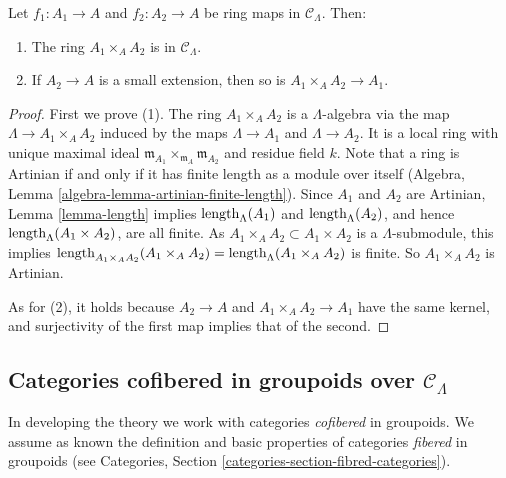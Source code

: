 \begin{lemma}
\label{lemma-fiber-product-CLambda}
Let $f_1 : A_1 \rightarrow A$ and $f_2 : A_2 \rightarrow A$ be ring maps in 
$\mathcal C_{\Lambda}$. Then:
\begin{enumerate}
\item The ring $A_1 \times_{A} A_2$ is in $\mathcal C_{\Lambda}$.
\item If $A_2 \rightarrow A$ is a small extension, then so is $A_1 \times_{A} 
A_2 \rightarrow A_1$.
\end{enumerate}
\end{lemma}

\begin{proof}
First we prove (1).  The ring $A_1 \times_{A} A_2$ is a $\Lambda$-algebra via 
the map $\Lambda \rightarrow A_1 \times_{A} A_2$ induced by the maps $\Lambda 
\rightarrow A_1$ and $\Lambda \rightarrow A_2$.  It is a local ring with unique 
maximal ideal $\mathfrak{m}_{A_1} \times_{\mathfrak{m}_{A}} \mathfrak{m}_{A_2}$ 
and residue field $k$. Note that a ring is Artinian if and only if it has 
finite length as a module over itself
(Algebra, Lemma \ref{algebra-lemma-artinian-finite-length}).
Since $A_1$ and $A_2$ are Artinian, Lemma \ref{lemma-length} implies 
$\textnormal{length}_{\Lambda}(A_1)$ and $\textnormal{length}_{\Lambda}(A_2)$, 
and hence $\textnormal{length}_{\Lambda}(A_1 \times A_2)$, are all finite.  As 
$A_1 \times_A A_2 \subset A_1 \times A_2$ is a $\Lambda$-submodule, this 
implies $\textnormal{length}_{A_1 \times_A A_2}(A_1 \times_{A} A_2) = 
\textnormal{length}_{\Lambda}(A_1 \times_{A} A_2)$ is finite. So $A_1 
\times_{A} A_2$ is Artinian.

\medskip \noindent
As for (2), it holds because $A_2 \rightarrow A$ and $A_1 \times_{A} A_2 
\rightarrow A_1$ have the same kernel, and surjectivity of the first map 
implies that of the second.
\end{proof}


\subsection{Categories cofibered in groupoids over $\mathcal C_{\Lambda}$}
\label{subsection-cofibered-groupoids}

\noindent
In developing the theory we work with categories {\it cofibered} in groupoids. 
 We assume as known the definition and basic properties of categories 
{\it fibered} in groupoids (see
Categories, Section \ref{categories-section-fibred-categories}).

